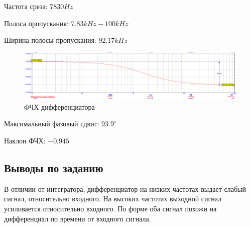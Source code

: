 \documentclass[a4paper,14pt]{article}
\begin{document}
Частота среза: $7830Hz$

Полоса пропускания: $7.83kHz - 100kHz$

Ширина полосы пропускания: $92.17kHz$

\begin{figure}[H]
	\centering
	\includegraphics[width=\linewidth]{../imgs/diff_pr}
	\caption{ФЧХ дифференциатора}
	\label{fig:diff_pr}
\end{figure}

Максимальный фазовый сдвиг: $93.9^{\circ}$

Наклон ФЧХ: $-0.945$

\subsection{Выводы по заданию}

В отличии от интегратора, дифференциатор на низких частотах выдает слабый сигнал, относительно входного.
На высоких частотах выходной сигнал усиливается относительно входного.
По форме оба сигнал похожи на дифференциал по времени от входного сигнала.
\end{document}
